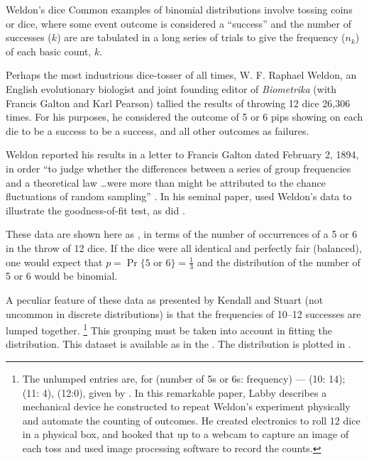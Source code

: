 \documentclass[11pt]{book}\usepackage[]{graphicx}\usepackage[]{color}
\begin{document}
\begin{Example}[dice]{Weldon's dice}
Common examples of binomial distributions involve tossing coins
or dice, where some event outcome is considered a ``success''
and the number of successes ($k$) are are tabulated 
in a long series of trials to give the frequency ($n_k$) 
of each basic count, $k$.

Perhaps the most industrious dice-tosser of all times,
W. F. Raphael Weldon, an English evolutionary biologist
and joint founding editor of \emph{Biometrika} (with Francis Galton and Karl Pearson)
tallied the results of throwing 12 dice 26,306 times.
For his purposes, he considered the outcome of 5 or 6 pips showing on each die
to be a success to be a success, and all other outcomes as failures.

Weldon reported his results in a letter to Francis Galton dated
February 2, 1894, in order
``to judge whether the differences between a series of group frequencies
and a theoretical law \dots were more than might be attributed
to the chance fluctuations of random sampling''
\citep{KempKemp:91}.
In his seminal paper,
\citet{Pearson:00} used Weldon's data to illustrate the \chisq{} goodness-of-fit test, as did
\citet[Table 5.1, p. 121]{KendallStuart:63}.  

These data are
shown here as
,
in terms of the number of occurrences of a 5 or
6 in the throw of 12 dice.
If the dice were all identical and perfectly fair (balanced), one would
expect that $p = \Pr\{5 \textrm{ or } 6\} = \frac13$
and the distribution of the number of 5 or 6 would be binomial.

A peculiar feature of these data
as presented by Kendall and Stuart (not uncommon in discrete distributions)
is that the frequencies of 10--12 successes
are lumped together.%
\footnote{
The unlumped entries are, for (number of 5s or 6s: frequency) ---
(10: 14); (11: 4), (12:0),
given by \citet{Labby:2009}.
In this remarkable paper, Labby describes a mechanical device he constructed to 
repeat Weldon's experiment physically and automate the counting of outcomes.
He created electronics to roll 12 dice in a physical box, and hooked that
up to a webcam to capture an image of each toss and used image processing
software to record the counts.
}
This grouping must be taken into account in fitting
the distribution.  This dataset is available as  in the
.  The distribution is plotted in .




\end{Example}
\end{document}
